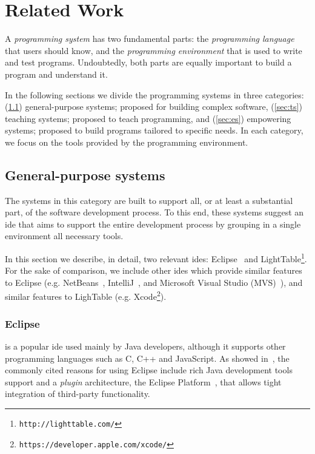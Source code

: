 
% 
% 

\section{Related Work}
\label{sec:rw}
A \textit{programming system} has two fundamental parts: the \textit{programming language} that users should know, and the \textit{programming environment} that is used to write and test programs. Undoubtedly, both parts are equally important to build a program and understand it.

In the following sections we divide the programming systems in three categories: (\ref{sec:gs}) general-purpose systems; proposed for building complex software, (\ref{sec:ts}) teaching systems; proposed to teach programming, and (\ref{sec:es}) empowering systems; proposed to build programs tailored to specific needs. In each category, we focus on the tools provided by the programming environment.
\subsection{General-purpose systems}
\label{sec:gs}

The systems in this category are built to support all, or at least a substantial part, of the software development process. To this end, these systems suggest an \ac{ide} that aims to support the entire development process by grouping in a single environment all necessary tools. 

In this section we describe, in detail, two relevant \ac{ide}s: Eclipse~\cite{carlson2005eclipse} and LightTable\footnote{\texttt{http://lighttable.com/}}. For the sake of comparison, we include other \ac{ide}s which provide similar features to Eclipse (e.g. NetBeans~\cite{boudreau2002netbeans}, IntelliJ~\cite{intellij2001intellij}, and Microsoft Visual Studio (MVS)~\cite{guckenheimer2006software}), and similar features to LighTable (e.g. Xcode\footnote{\texttt{https://developer.apple.com/xcode/}}).
\subsubsection{Eclipse~\cite{carlson2005eclipse}} is a popular \ac{ide} used mainly by Java developers, although it supports other programming languages such as C, C++ and JavaScript. As showed in~\cite{murphy2006java}, the commonly cited reasons for using Eclipse include rich Java development tools support and a \textit{plugin} architecture, the Eclipse Platform~\cite{DesRivieres2004}, that allows tight integration of third-party functionality.

